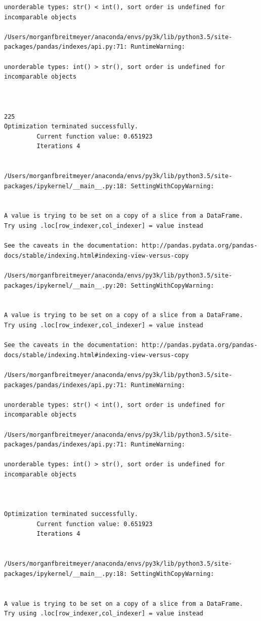 \begin{lstlisting}
unorderable types: str() < int(), sort order is undefined for incomparable objects

/Users/morganfbreitmeyer/anaconda/envs/py3k/lib/python3.5/site-packages/pandas/indexes/api.py:71: RuntimeWarning:

unorderable types: int() > str(), sort order is undefined for incomparable objects



225
Optimization terminated successfully.
         Current function value: 0.651923
         Iterations 4


/Users/morganfbreitmeyer/anaconda/envs/py3k/lib/python3.5/site-packages/ipykernel/__main__.py:18: SettingWithCopyWarning:


A value is trying to be set on a copy of a slice from a DataFrame.
Try using .loc[row_indexer,col_indexer] = value instead

See the caveats in the documentation: http://pandas.pydata.org/pandas-docs/stable/indexing.html#indexing-view-versus-copy

/Users/morganfbreitmeyer/anaconda/envs/py3k/lib/python3.5/site-packages/ipykernel/__main__.py:20: SettingWithCopyWarning:


A value is trying to be set on a copy of a slice from a DataFrame.
Try using .loc[row_indexer,col_indexer] = value instead

See the caveats in the documentation: http://pandas.pydata.org/pandas-docs/stable/indexing.html#indexing-view-versus-copy

/Users/morganfbreitmeyer/anaconda/envs/py3k/lib/python3.5/site-packages/pandas/indexes/api.py:71: RuntimeWarning:

unorderable types: str() < int(), sort order is undefined for incomparable objects

/Users/morganfbreitmeyer/anaconda/envs/py3k/lib/python3.5/site-packages/pandas/indexes/api.py:71: RuntimeWarning:

unorderable types: int() > str(), sort order is undefined for incomparable objects



Optimization terminated successfully.
         Current function value: 0.651923
         Iterations 4


/Users/morganfbreitmeyer/anaconda/envs/py3k/lib/python3.5/site-packages/ipykernel/__main__.py:18: SettingWithCopyWarning:


A value is trying to be set on a copy of a slice from a DataFrame.
Try using .loc[row_indexer,col_indexer] = value instead


\end{lstlisting}
